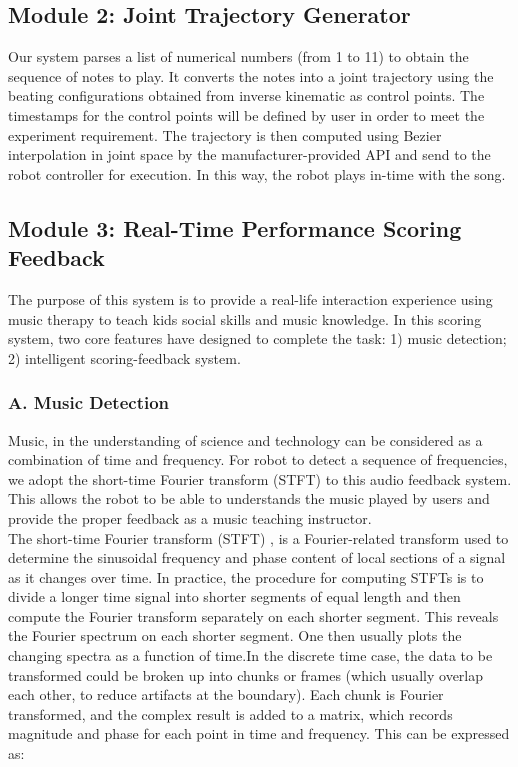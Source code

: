 \subsection{Module 2: Joint Trajectory Generator}
Our system parses a list of numerical numbers (from 1 to 11) to obtain the sequence
of notes to play. It converts the notes into a joint trajectory using the beating
configurations obtained from inverse kinematic as control points. The timestamps
for the control points will be defined by user in order to meet the experiment requirement.
The trajectory is then computed using Bezier interpolation in joint space by the
manufacturer-provided API and send to the robot controller for execution. In this
way, the robot plays in-time with the song.\\

\subsection{Module 3: Real-Time Performance Scoring Feedback}
The purpose of this system is to provide a real-life interaction experience using 
music therapy to teach kids social skills and music knowledge.  In this scoring 
system, two core features have designed to complete the task: 1) music detection;
2) intelligent scoring-feedback system.\\


\subsubsection{A. Music Detection}
Music, in the understanding of science and technology can be considered as a combination 
of time and frequency. For robot to detect a sequence of frequencies, we adopt the 
short-time Fourier transform (STFT) to this audio feedback system. This allows the robot to 
be able to understands the music played by users and provide the proper feedback as
a music teaching instructor.\\

The short-time Fourier transform (STFT) , is a Fourier-related transform used to 
determine the sinusoidal frequency and phase content of local sections of a signal 
as it changes over time. In practice, the procedure for computing STFTs is to divide 
a longer time signal into shorter segments of equal length and then compute the 
Fourier transform separately on each shorter segment. This reveals the Fourier 
spectrum on each shorter segment. One then usually plots the changing spectra as 
a function of time.In the discrete time case, the data to be transformed could 
be broken up into chunks or frames (which usually overlap each other, to reduce 
artifacts at the boundary). Each chunk is Fourier transformed, and the complex 
result is added to a matrix, which records magnitude and phase for each point in 
time and frequency. This can be expressed as:

